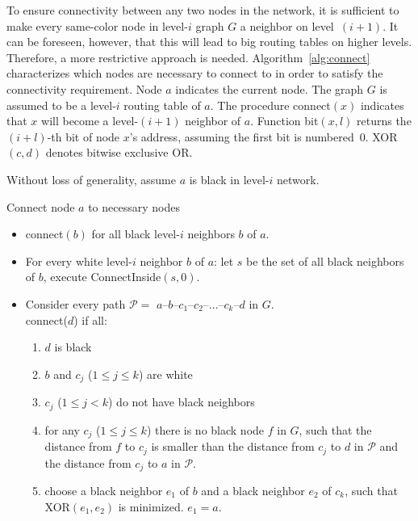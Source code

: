 \documentclass[conference]{IEEEtran}
\theoremstyle{definition}
\newcommand{\cP}{{\mathcal{P}}}
\newcommand{\cN}{{\mathcal{N}}}
\begin{document}
To ensure connectivity between any two nodes in the network, it is sufficient to make every same-color node in level-$i$ graph $G$ a neighbor on level~$(i+1)$. It can be foreseen, however, that this will lead to big routing tables on higher levels. Therefore, a more restrictive approach is needed. Algorithm~\ref{alg:connect} characterizes which nodes are necessary to connect to in order to satisfy the connectivity requirement. Node $a$ indicates the current node. The graph $G$ is assumed to be a level-$i$ routing table of $a$.
The procedure  connect$(x)$ indicates that $x$ will become a level-$(i+1)$ neighbor of $a$. Function bit$(x, l)$ returns the $(i + l)$-th bit of node $x$'s address, assuming the first bit is numbered~0. XOR$(c, d)$ denotes bitwise exclusive OR.

Without loss of generality, assume $a$ is black in level-$i$ network.



\begin{algorithm}[H]
    \caption{Connect node $a$ to necessary nodes}
    \label{alg:connect}

    \begin{itemize} 
        \item   connect$(b)$ for all black level-$i$ neighbors $b$ of $a$.

        \item   For every white level-$i$ neighbor $b$ of $a$: 
                let $s$ be the set of all black neighbors of $b$, execute ConnectInside$(s, 0)$.

        \item   Consider every path $\cP = $ $a$--$b$--$c_1$--$c_2$--...--$c_k$--$d$ in $G$.  \\
        connect($d$) if all:
        \begin{enumerate}
            \item   $d$ is black
            \item   $b$ and $c_j$ ($1 \le j \le k$) are white
            \item   $c_j$ ($1 \le j < k$) do not have black neighbors
            \item   for any $c_j$ ($1 \le j \le k$) there is no black node $f$ in $G$, such that the distance
                    from $f$ to $c_j$ is smaller than the distance
                    from $c_j$ to $d$ in $\cP$ and the distance from $c_j$ to $a$ in $\cP$.
            \item   choose a black neighbor $e_1$ of $b$ and a black neighbor $e_2$ of $c_k$,
                    such that XOR$(e_1, e_2)$ is minimized. $e_1 = a$.
        \end{enumerate}
    \end{itemize} 
\end{algorithm}
\end{document}
